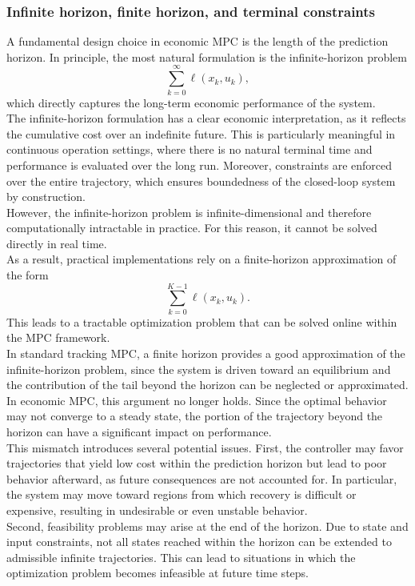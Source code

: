 \subsubsection{Infinite horizon, finite horizon, and terminal constraints}
A fundamental design choice in economic MPC is the length of the prediction horizon. In principle, the most natural formulation is the infinite-horizon problem
\[
\sum_{k=0}^{\infty} \ell(x_k,u_k),
\]
which directly captures the long-term economic performance of the system.\\
The infinite-horizon formulation has a clear economic interpretation, as it reflects the cumulative cost over an indefinite future. This is particularly meaningful in continuous operation settings, where there is no natural terminal time and performance is evaluated over the long run. Moreover, constraints are enforced over the entire trajectory, which ensures boundedness of the closed-loop system by construction.\\
However, the infinite-horizon problem is infinite-dimensional and therefore computationally intractable in practice. For this reason, it cannot be solved directly in real time.\\

As a result, practical implementations rely on a finite-horizon approximation of the form
\[
\sum_{k=0}^{K-1} \ell(x_k,u_k).
\]
This leads to a tractable optimization problem that can be solved online within the MPC framework.\\
In standard tracking MPC, a finite horizon provides a good approximation of the infinite-horizon problem, since the system is driven toward an equilibrium and the contribution of the tail beyond the horizon can be neglected or approximated. In economic MPC, this argument no longer holds. Since the optimal behavior may not converge to a steady state, the portion of the trajectory beyond the horizon can have a significant impact on performance.\\

This mismatch introduces several potential issues. First, the controller may favor trajectories that yield low cost within the prediction horizon but lead to poor behavior afterward, as future consequences are not accounted for. In particular, the system may move toward regions from which recovery is difficult or expensive, resulting in undesirable or even unstable behavior.\\
Second, feasibility problems may arise at the end of the horizon. Due to state and input constraints, not all states reached within the horizon can be extended to admissible infinite trajectories. This can lead to situations in which the optimization problem becomes infeasible at future time steps.\\

